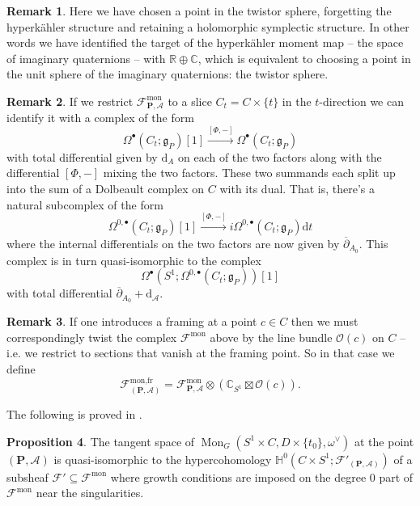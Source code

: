 \documentclass[11pt, oneside, reqno]{amsart}
\theoremstyle{definition} \newtheorem{definition}{Definition}[section]
\newtheorem{prop}[definition]{Proposition}
\theoremstyle{definition} \newtheorem{remark}[definition]{Remark}
\theoremstyle{definition} \newtheorem{remarks}[definition]{Remarks}
\theoremstyle{definition} \newtheorem{question}[definition]{Question}
\theoremstyle{definition} \newtheorem*{note}{Note}
\theoremstyle{definition} \newtheorem{example}[definition]{Example}
\theoremstyle{definition} \newtheorem{examples}[definition]{Examples}
\renewcommand{\gg}{\mathfrak{g}}
\newcommand{\bb}[1]{\mathbb{#1}}
\newcommand{\mr}[1]{\mathrm{#1}}
\newcommand{\mc}[1]{\mathcal{#1}}
\newcommand{\bo}[1]{\boldsymbol{#1}}
\newcommand{\dd}{\partial}
\newcommand{\ol}[1]{\overline{#1}}
\newcommand{\CC}{\mathbb{C}}
\newcommand{\RR}{\mathbb{R}}
\newcommand{\OO}{\mathcal{O}}
\newcommand{\sub}{\subseteq}
\DeclareMathOperator{\mon}{Mon}
\renewcommand{\d}{\mathrm{d}}
\begin{document}
\begin{remark}
Here we have chosen a point in the twistor sphere, forgetting the hyperk\"ahler structure and retaining a holomorphic symplectic structure.  In other words we have identified the target of the hyperk\"ahler moment map -- the space of imaginary quaternions -- with $\RR \oplus \CC$, which is equivalent to choosing a point in the unit sphere of the imaginary quaternions: the twistor sphere.  
\end{remark}

\begin{remark} \label{monopole_holo_restriction_rmk}
If we restrict $\mc F^{\mr{mon}}_{\bo P, \mc A}$ to a slice $C_t = C \times \{t\}$ in the $t$-direction we can identify it with a complex of the form
\[\Omega^\bullet(C_t; \gg_P)[1] \overset {[\Phi,-]} \to \Omega^\bullet(C_t; \gg_P)\]
with total differential given by $\d_A$ on each of the two factors along with the differential $[\Phi,-]$ mixing the two factors.  These two summands each split up into the sum of a Dolbeault complex on $C$ with its dual.  That is, there's a natural subcomplex of the form
\[\Omega^{0,\bullet}(C_t; \gg_P)[1] \overset {[\Phi,-]} \to i \Omega^{0,\bullet}(C_t; \gg_P) \d t\]
where the internal differentials on the two factors are now given by $\ol \dd_{A_0}$.  This complex is in turn quasi-isomorphic to the complex
\[\Omega^\bullet(S^1; \Omega^{0,\bullet}(C_t;\gg_P))[1]\]
with total differential $\ol \dd_{A_0} + \d_{\mc A}$.
\end{remark}

\begin{remark}
If one introduces a framing at a point $c \in C$ then we must correspondingly twist the complex $\mc F^{\mr{mon}}$ above by the line bundle $\OO(c)$ on $C$ -- i.e. we restrict to sections that vanish at the framing point.  So in that case we define
\[\mc F^{\text{mon,fr}}_{(\bo P,\mc A)} = \mc F^{\mr{mon}}_{\bo P, \mc A} \otimes (\CC_{S^1} \boxtimes \OO(c)).\]
\end{remark}

The following is proved in \cite{FoscoloDef}.
 
\begin{prop}
The tangent space of $\mon_G(S^1 \times C, D \times \{t_0\}, \omega^\vee)$ at the point $(\bo P,\mc A)$ is quasi-isomorphic to the hypercohomology $\bb H^0(C \times S^1; \mc F'_{(\bo P,\mc A)})$ of a subsheaf $\mc F' \sub \mc F^{\mr{mon}}$ where growth conditions are imposed on the degree 0 part of $\mc F^{\mr{mon}}$ near the singularities.
\end{prop}
\end{document}
